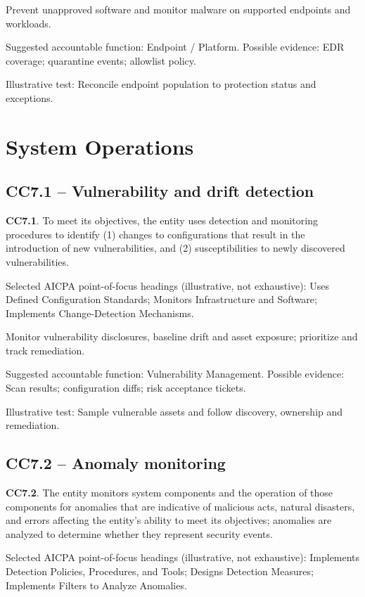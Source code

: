 \documentclass[10pt,oneside]{report}
\begin{document}
\begin{engineeringbox}
Prevent unapproved software and monitor malware on supported endpoints and workloads.
\end{engineeringbox}
Suggested accountable function: Endpoint / Platform. Possible evidence: EDR coverage; quarantine events; allowlist policy.

Illustrative test: Reconcile endpoint population to protection status and exceptions.

\section{System Operations}
\subsection*{CC7.1 -- Vulnerability and drift detection}
\begin{aicpabox}
\textbf{CC7.1}. To meet its objectives, the entity uses detection and monitoring procedures to identify (1) changes to configurations that result in the introduction of new vulnerabilities, and (2) susceptibilities to newly discovered vulnerabilities.\par{}
\end{aicpabox}
Selected AICPA point-of-focus headings (illustrative, not exhaustive): Uses Defined Configuration Standards; Monitors Infrastructure and Software; Implements Change-Detection Mechanisms.

\begin{engineeringbox}
Monitor vulnerability disclosures, baseline drift and asset exposure; prioritize and track remediation.
\end{engineeringbox}
Suggested accountable function: Vulnerability Management. Possible evidence: Scan results; configuration diffs; risk acceptance tickets.

Illustrative test: Sample vulnerable assets and follow discovery, ownership and remediation.

\subsection*{CC7.2 -- Anomaly monitoring}
\begin{aicpabox}
\textbf{CC7.2}. The entity monitors system components and the operation of those components for anomalies that are indicative of malicious acts, natural disasters, and errors affecting the entity's ability to meet its objectives; anomalies are analyzed to determine whether they represent security events.\par{}
\end{aicpabox}
Selected AICPA point-of-focus headings (illustrative, not exhaustive): Implements Detection Policies, Procedures, and Tools; Designs Detection Measures; Implements Filters to Analyze Anomalies.
\end{document}
